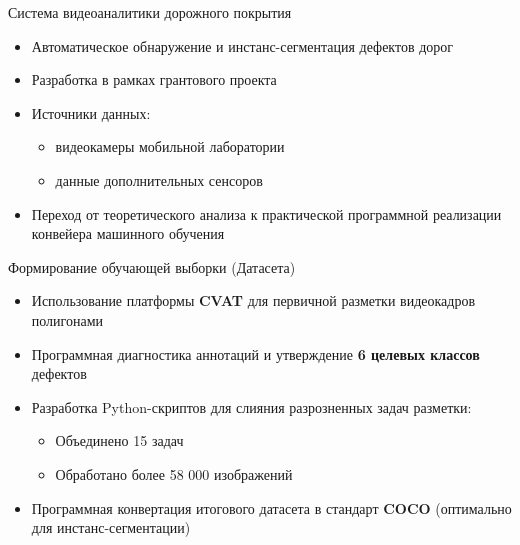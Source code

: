 \documentclass[hyperref={unicode}]{beamer}
\begin{document}
\begin{frame}{Система видеоаналитики дорожного покрытия}
\begin{itemize}
    \item Автоматическое обнаружение и инстанс-сегментация дефектов дорог
    \item Разработка в рамках грантового проекта
    \item Источники данных:
    \begin{itemize}
        \item видеокамеры мобильной лаборатории
        \item данные дополнительных сенсоров
    \end{itemize}
    \item Переход от теоретического анализа к практической программной реализации конвейера машинного обучения
\end{itemize}
\end{frame}

\begin{frame}{Формирование обучающей выборки (Датасета)}
\begin{itemize}
    \item Использование платформы \textbf{CVAT} для первичной разметки видеокадров полигонами
    \item Программная диагностика аннотаций и утверждение \textbf{6 целевых классов} дефектов
    \item Разработка Python-скриптов для слияния разрозненных задач разметки:
    \begin{itemize}
        \item Объединено 15 задач
        \item Обработано более 58 000 изображений
    \end{itemize}
    \item Программная конвертация итогового датасета в стандарт \textbf{COCO} (оптимально для инстанс-сегментации)
\end{itemize}
\end{frame}
\end{document}
